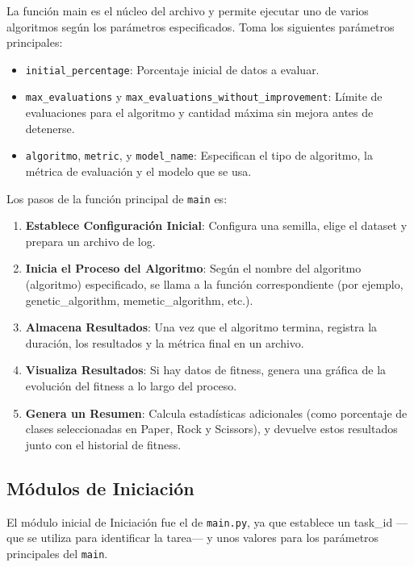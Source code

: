 La función main es el núcleo del archivo y permite ejecutar uno de varios algoritmos según los parámetros
especificados.
Toma los siguientes parámetros principales:
\begin{itemize}
    \item \texttt{initial\_percentage}: Porcentaje inicial de datos a evaluar.
    \item \texttt{max\_evaluations} y \texttt{max\_evaluations\_without\_improvement}: Límite de evaluaciones para el
          algoritmo y cantidad máxima sin mejora antes de detenerse.
    \item \texttt{algoritmo}, \texttt{metric}, y \texttt{model\_name}: Especifican el tipo de algoritmo, la métrica de
          evaluación y el modelo que se usa.
\end{itemize}

Los pasos de la función principal de \texttt{main} es:
\begin{enumerate}
    \item \textbf{Establece Configuración Inicial}: Configura una semilla, elige el dataset y prepara un archivo de log.
    \item \textbf{Inicia el Proceso del Algoritmo}: Según el nombre del algoritmo (algoritmo) especificado, se llama a
          la función correspondiente (por ejemplo, genetic\_algorithm, memetic\_algorithm, etc.).
    \item \textbf{Almacena Resultados}: Una vez que el algoritmo termina, registra la duración, los resultados y la
          métrica final en un archivo.
    \item \textbf{Visualiza Resultados}: Si hay datos de fitness, genera una gráfica de la evolución del fitness a lo
          largo del proceso.
    \item \textbf{Genera un Resumen}: Calcula estadísticas adicionales (como porcentaje de clases seleccionadas en
          Paper, Rock y Scissors), y devuelve estos resultados junto con el historial de fitness.
\end{enumerate}

\subsection{Módulos de Iniciación}\label{subsec:modulos-de-iniciacion}
El módulo inicial de Iniciación fue el de \texttt{main.py}, ya que establece un task\_id —que se utiliza para
identificar la tarea— y unos valores para los parámetros principales del \texttt{main}. \\[6pt]

